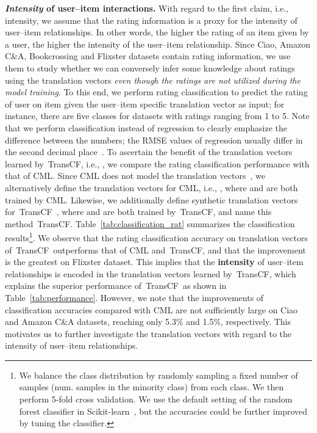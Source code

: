 \documentclass[conference]{IEEEtran}
\newcommand{\propose}{\textsf{{TransCF}}}
\newcommand{\proposeemb}{\propose}
\begin{document}
\smallskip
\noindent\textbf{\textit{Intensity} of user--item interactions.}
With regard to the first claim, i.e., intensity, we assume that the rating information is a proxy for the intensity of user--item relationships. In other words, the higher the rating of an item given by a user, the higher the intensity of the user--item relationship. Since Ciao, Amazon C\&A, Bookcrossing and Flixster datasets contain rating information, we use them to study whether we can conversely infer some knowledge about ratings using the translation vectors \textit{even though the ratings are not utilized during the model training}. 
To this end, we perform rating classification to predict the rating of user  on item  given the user--item specific translation vector  as input; for instance, there are five classes for datasets with ratings ranging from 1 to 5. Note that we perform classification instead of regression to clearly emphasize the difference between the numbers; the RMSE values of regression usually differ in the second decimal place~\cite{koren2008factorization}.
To ascertain the benefit of the translation vectors learned by~\propose, i.e., , we compare the rating classification performance with that of CML. Since CML does not model the translation vectors~\cite{hsieh2017collaborative}, we alternatively define the translation vectors for CML, i.e., , where  and  are both trained by CML. Likewise, we additionally define synthetic translation vectors  for~\propose~, where  and  are both trained by~\propose, and name this method~\proposeemb. Table~\ref{tab:classification_rat} summarizes the classification results\footnote{\label{note1}We balance the class distribution by randomly sampling a fixed number of samples (num. samples in the minority class) from each class. We then perform 5-fold cross validation. We use the default setting of the random forest classifier in Scikit-learn~\cite{scikit-learn}, but the accuracies could be further improved by tuning the classifier.}.
We observe that the rating classification accuracy on translation vectors of~\propose~outperforms that of CML and~\proposeemb, and that the improvement is the greatest on Flixster dataset. 
This implies that the \textbf{intensity} of user--item relationships is encoded in the translation vectors learned by~\propose, which explains the superior performance of~\propose~as shown in Table~\ref{tab:performance}.
However, we note that the improvements of classification accuracies compared with CML are not sufficiently large on Ciao and Amazon C\&A datasets, reaching only 5.3\% and 1.5\%, respectively.
This motivates us to further investigate the translation vectors with regard to the intensity of user--item relationships.
\end{document}

